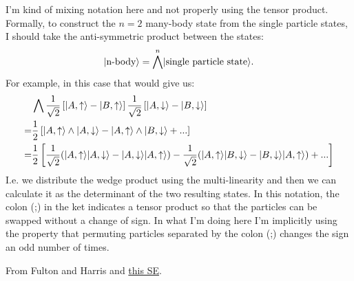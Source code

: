 \documentclass[12pt]{article}
\DeclarePairedDelimiter\ket{\lvert}{\rangle}%
\numberwithin{equation}{section}
\begin{document}
\begin{tcolorbox}[title=Formal Note, 
    colback=gray!5!white, 
    colframe=gray!80!black, 
    breakable, 
    enhanced, 
    sharp corners=south, 
    before upper={\parindent15pt}]
I'm kind of mixing notation here and not properly using the tensor product. Formally, to construct the $n=2$ many-body state from the single particle states, I should take the anti-symmetric product between the states:
\begin{equation}
    \ket{\text{n-body}}=\bigwedge^{n}\ket{\text{single particle state}}.
\end{equation}
For example, in this case that would give us:
\begin{align}
    &\bigwedge  \frac{1}{\sqrt{2}}\left[\ket{A,\uparrow}-\ket{B,\uparrow}\right]
    \frac{1}{\sqrt{2}}\left[\ket{A,\downarrow}-\ket{B,\downarrow}\right]\\
    =&\frac{1}{2}
    \left[
        \ket{A,\uparrow}\wedge\ket{A,\downarrow}-\ket{A,\uparrow}\wedge\ket{B,\downarrow}+...
    \right]\\
    =&\frac{1}{2}
    \left[
        \frac{1}{\sqrt{2}}(\ket{A,\uparrow}\ket{A,\downarrow}-\ket{A,\downarrow}\ket{A,\uparrow})
        -\frac{1}{\sqrt{2}}(\ket{A,\uparrow}\ket{B,\downarrow}-\ket{B,\downarrow}\ket{A,\uparrow})
        +...
    \right]
\end{align}
I.e. we distribute the wedge product using the multi-linearity and then we can calculate it as the determinant of the two resulting states. In this notation, the colon (;) in the ket indicates a tensor product so that the particles can be swapped without a change of sign. In what I'm doing here I'm implicitly using the property that permuting particles separated by the colon (;) changes the sign an odd number of times.

From Fulton and Harris and \href{https://math.stackexchange.com/questions/1757039/how-to-prove-that-the-wedge-product-is-the-determinant-spivaks-claim}{this SE}.
\end{tcolorbox}
\end{document}
